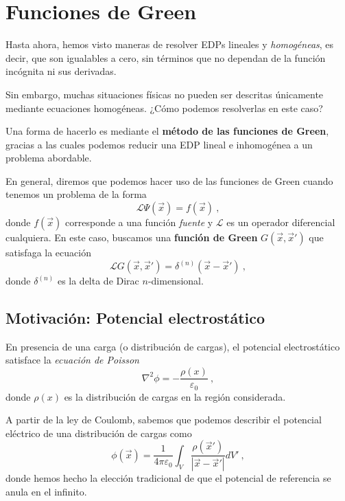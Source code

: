 \chapter{Funciones de Green}

Hasta ahora, hemos visto maneras de resolver EDPs lineales y \emph{homogéneas}, es decir, que son igualables a cero, sin términos que no dependan de la función incógnita ni sus derivadas.

Sin embargo, muchas situaciones físicas no pueden ser descritas únicamente mediante ecuaciones homogéneas. ¿Cómo podemos resolverlas en este caso?

Una forma de hacerlo es mediante el \textbf{método de las funciones de Green}, gracias a las cuales podemos reducir una EDP lineal e inhomogénea a un problema abordable.

En general, diremos que podemos hacer uso de las funciones de Green cuando tenemos un problema de la forma
\begin{equation}
    \mathcal{L}\Psi(\vec{x}) = f(\vec{x}) \ ,
\end{equation}
donde $f(\vec{x})$ corresponde a una función \emph{fuente} y $\mathcal{L}$ es un operador diferencial cualquiera. En este caso, buscamos una \textbf{función de Green} $G(\vec{x}, \vec{x}')$ que satisfaga la ecuación
\begin{equation}\label{eq:condicion_green}
    \mathcal{L}G(\vec{x}, \vec{x}') = \delta^{(n)}(\vec{x} - \vec{x}') \ ,
\end{equation}
donde $\delta^{(n)}$ es la delta de Dirac $n$-dimensional.

\section{Motivación: Potencial electrostático}

En presencia de una carga (o distribución de cargas), el potencial electrostático satisface la \emph{ecuación de Poisson}
\begin{equation}
    \nabla^2 \phi = - \frac{\rho(x)}{\varepsilon_0} \ ,
\end{equation}
donde $\rho(x)$ es la distribución de cargas en la región considerada.

A partir de la ley de Coulomb, sabemos que podemos describir el potencial eléctrico de una distribución de cargas como
\begin{equation} \label{eq:potencial_coulomb}
    \phi(\vec{x}) = \frac{1}{4\pi \varepsilon_0} \int_V \frac{\rho(\vec{x}')}{|\vec{x} - \vec{x}'|} dV' \ ,
\end{equation}
donde hemos hecho la elección tradicional de que el potencial de referencia se anula en el infinito.

